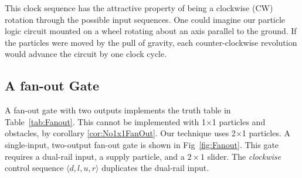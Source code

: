 \documentclass[letterpaper, 10 pt, conference]{ieeeconf}
\begin{document}
  

This clock sequence has the attractive property of being a clockwise (CW) rotation through the possible input sequences.  One could imagine our particle logic circuit mounted on a wheel rotating about an axis parallel to the ground. If the particles were moved by the pull of gravity, each counter-clockwise revolution would advance the circuit by one clock cycle.

\subsection{A {\sc fan-out} Gate}\label{sec:FanOut}
A {\sc fan-out} gate with two outputs implements the truth table in Table~\ref{tab:Fanout}.  
This cannot be implemented with 1$\times$1 particles and obstacles, by corollary \ref{cor:No1x1FanOut}.   Our technique uses 2$\times$1 particles.   A single-input, two-output {\sc fan-out} gate is shown in Fig~\ref{fig:Fanout}.  This gate requires a dual-rail input, a supply particle, and a $2\times 1$ slider.  The  \emph{clockwise} control sequence $\langle d,l,u,r \rangle$  duplicates the dual-rail input.
\end{document}
